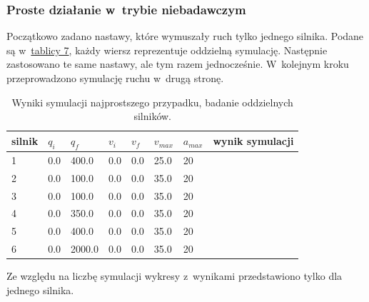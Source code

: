\documentclass[a4paper, 12pt]{article}
\begin{document}
	\subsubsection{Proste działanie w~trybie niebadawczym}
	Początkowo zadano nastawy, które wymuszały ruch tylko jednego silnika. Podane są w~\hyperref[tab:setup1]{tablicy 7}, każdy wiersz reprezentuje oddzielną symulację. Następnie zastosowano te same nastawy, ale tym razem jednocześnie. W~kolejnym kroku przeprowadzono symulację ruchu w~drugą stronę. 
	\begin{table}[H]
	\centering
	\begin{tabular}{|m{2.5em}|m{4em}|m{4em}|m{4em}|m{4em}|m{4em}|m{4em}|m{5em}|}
	\hline
	silnik&$ q_i $ & $ q_f $ & $ v_i $ & $ v_f $ & $ v_{max} $ & $ a_{max} $&wynik symulacji\\
	\hline
	\hline
	\hspace{1em}1& 0.0 & 400.0 & 0.0 & 0.0 & 25.0 & 20&\hspace{2em}\checkmark\\ 
	\hline
	\hspace{1em}2& 0.0 & 100.0 & 0.0 & 0.0 & 35.0 & 20&\hspace{2em}\checkmark\\  
	\hline
	\hspace{1em}3& 0.0 & 100.0 & 0.0 & 0.0 & 35.0 & 20&\hspace{2em}\checkmark\\ 
	\hline
	\hspace{1em}4& 0.0 & 350.0 & 0.0 & 0.0 & 35.0 & 20&\hspace{2em}\checkmark\\  
	\hline
	\hspace{1em}5& 0.0 & 400.0 & 0.0 & 0.0 & 35.0 & 20&\hspace{2em}\checkmark\\  
	\hline
	\hspace{1em}6& 0.0 & 2000.0 & 0.0 & 0.0 & 35.0 & 20&\hspace{2em}\checkmark\\  
	\hline
	\end{tabular}
	\caption{Wyniki symulacji najprostszego przypadku, badanie oddzielnych silników.}
	\label{tab:setup1}
	\end{table}
	Ze względu na liczbę symulacji wykresy z~wynikami przedstawiono tylko dla jednego silnika.
\end{document}
